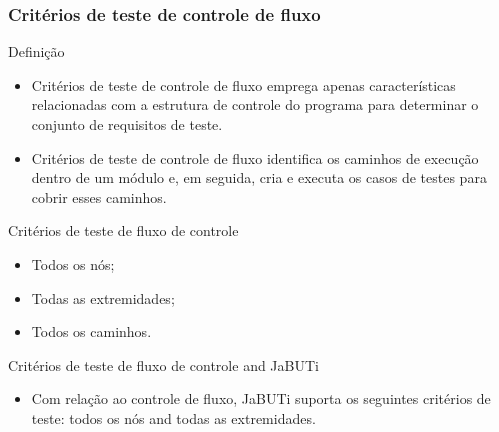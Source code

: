 \begin{frame}[parent={cmap:structural-software-testing},hasnext=true,hasprev=true]
\frametitle{Critérios de teste de controle de fluxo}
\label{concept:control-flow-test-criterion}

\begin{block:concept}{Definição}
\begin{itemize}
	\item Critérios de teste de controle de fluxo emprega apenas características relacionadas
	com a estrutura de controle do programa para determinar o conjunto de requisitos
	de teste.

	\item Critérios de teste de controle de fluxo identifica os caminhos de execução
	dentro de um módulo e, em seguida, cria e executa os casos de testes para cobrir
	esses caminhos.
\end{itemize}
\end{block:concept}

\begin{block:fact}{Critérios de teste de fluxo de controle}
\begin{itemize}
	\item Todos os nós;
	\item Todas as extremidades;
	\item Todos os caminhos.
\end{itemize}
\end{block:fact}


\begin{block:fact}{Critérios de teste de fluxo de controle and JaBUTi}
\begin{itemize}
	\item Com relação ao controle de fluxo, JaBUTi suporta os seguintes critérios de teste:
	todos os nós and todas as extremidades.
\end{itemize}
\end{block:fact}
\end{frame}


